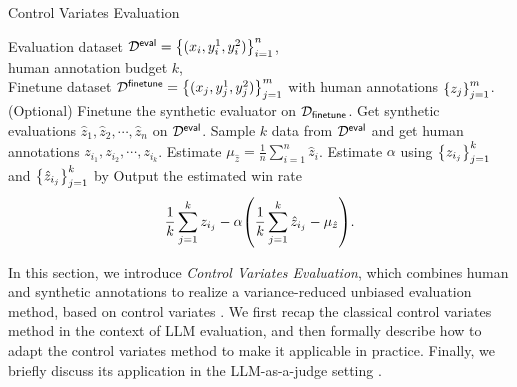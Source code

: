 \begin{algorithm}[tb]
   \caption{Control Variates Evaluation}
   \label{alg:cv}
\begin{algorithmic}[1]
    Evaluation dataset $\mathcal{D}^{\mathsf{eval}} = \left\{(x_i,y_i^1, y_i^2)\right\}_{i=1}^n$, \\
   human annotation budget $k$, \\
    Finetune dataset $\mathcal{D}^{\mathsf{finetune}} = \left\{(x_j,y_j^1, y_j^2)\right\}_{j=1}^m$ with human annotations $\left\{z_j\right\}_{j=1}^m$.
   \STATE (Optional) Finetune the synthetic evaluator on $\mathcal{D}_{\mathsf{finetune}}$.   
    \STATE Get synthetic evaluations $\hat z_1, \hat z_2, \cdots, \hat z_n$ on $\mathcal{D}^{\mathsf{eval}}$.
    \STATE Sample $k$ data from $\mathcal{D}^{\mathsf{eval}}$ and get human annotations $z_{i_1}, z_{i_2}, \cdots, z_{i_k}$.
    \STATE Estimate $\mu_{\hat z} = \frac{1}{n} \sum_{i=1}^n \hat z_i$.
    \STATE Estimate $\alpha$ using $\left\{z_{i_j}\right\}_{j=1}^k$ and $\left\{\hat z_{i_j}\right\}_{j=1}^k$ by 
    \STATE Output the estimated win rate 
    \[\frac{1}{k} \sum_{j=1}^k z_{i_j} - \alpha\prn*{\frac{1}{k}\sum_{j=1}^k \hat z_{i_j} - \mu_{\hat z} }.
    \]
\end{algorithmic}
\end{algorithm}

In this section, we introduce \emph{Control Variates Evaluation}, which combines human and synthetic annotations to realize a variance-reduced unbiased evaluation method, based on control variates \citep{lavenberg1981perspective}. We first recap the classical control variates method in the context of LLM evaluation, and then formally describe how to adapt the control variates method to make it applicable in practice. Finally, we briefly discuss its application in the LLM-as-a-judge setting \citep{zheng2023judging}.

